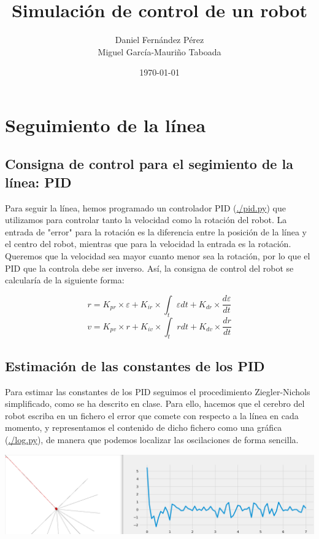 \documentclass[11pt]{article}
\author{Daniel Fernández Pérez\\Miguel García-Mauriño Taboada}
\date{\today}
\title{Simulación de control de un robot}
\begin{document}
\maketitle
\tableofcontents
\pagebreak

\section{Seguimiento de la línea}
\label{sec-1}

\subsection{Consigna de control para el segimiento de la línea: PID}
\label{sec-1-1}
Para seguir la línea, hemos programado un controlador PID (\url{./pid.py}) que utilizamos para controlar
tanto la velocidad como la rotación del robot. La entrada de "error" para la rotación es la diferencia
entre la posición de la línea y el centro del robot, mientras que para la velocidad la entrada es la
 rotación. Queremos que la velocidad sea mayor cuanto menor sea la rotación, por lo que el PID que la
 controla debe ser inverso. Así, la consigna de control del robot se calcularía de la siguiente forma:

 \begin{center}
   \begin{equation}
     r = K_{pr} \times \varepsilon + K_{ir} \times \int_{t} \varepsilon dt + K_{dr} \times \frac{d\varepsilon}{dt}
   \end{equation}
   \begin{equation}
    v = K_{pv} \times r + K_{iv} \times \int_{t} r dt + K_{dv} \times \frac{dr}{dt}
   \end{equation}
 \end{center}

\subsection{Estimación de las constantes de los PID}
\label{sec-1-2}
Para estimar las constantes de los PID seguimos el procedimiento Ziegler-Nichols simplificado, como se
ha descrito en clase. Para ello, hacemos que el cerebro del robot escriba en un fichero el error que
comete con respecto a la línea en cada momento, y representamos el contenido de dicho fichero como una
gráfica (\url{./log.py}), de manera que podemos localizar las oscilaciones de forma sencilla.


\includegraphics[width=.9\linewidth]{../doc-images/linea_grafica.png}
\end{document}
